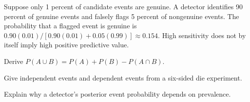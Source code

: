 \begin{workedexample}
Suppose only 1 percent of candidate events are genuine. A detector identifies 90 percent of genuine events and falsely flags 5 percent of nongenuine events. The probability that a flagged event is genuine is $0.90(0.01)/[0.90(0.01)+0.05(0.99)]\approx0.154$. High sensitivity does not by itself imply high positive predictive value.
\end{workedexample}
\begin{exercises}
\item Derive $P(A\cup B)=P(A)+P(B)-P(A\cap B)$.
\item Give independent events and dependent events from a six-sided die experiment.
\item Explain why a detector's posterior event probability depends on prevalence.
\end{exercises}